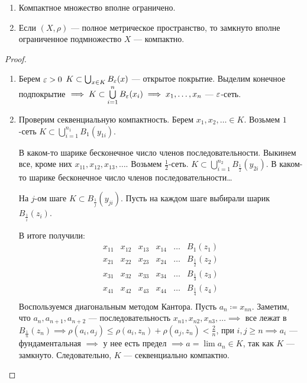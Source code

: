\begin{theorem}[Хаусдорфа]
    \begin{enumerate}
        \item Компактное множество вполне ограничено.
        \item Если $(X, \rho)$ --- полное метрическое пространство, то замкнуто вполне ограниченное подмножество  $X$ --- компактно.
    \end{enumerate}
\end{theorem}
\begin{proof}
    \begin{enumerate}
        \item Берем $\varepsilon > 0$  $K \subset \bigcup_{x \in K} B_\varepsilon(x)$ --- открытое покрытие. Выделим конечное подпокрытие  $\implies K \subset \bigcup\limits_{i=1}^n B_\varepsilon(x_i) \implies x_1, \ldots, x_n$  --- $\varepsilon$-сеть.
        \item Проверим секвенциальную компактность. Берем  $x_1, x_2, \ldots \in K$. Возьмем $1$-сеть  $K \subset \bigcup_{i=1}^{n_1} B_1(y_{1i})$.

            В каком-то шарике бесконечное число членов последовательности. Выкинем все, кроме них  $x_{11}, x_{12}, x_{13},\ldots$. Возьмем $\frac{1}{2}$-сеть. $K \subset \bigcup\limits_{i=1}^{n_2} B_{\frac{1}{2}}(y_{2i})$. В каком-то шарике бесконечное число членов последовательности\dots

            На $j$-ом шаге  $K \subset B_{\frac{1}{j}}(y_{ji})$. Пусть на каждом шаге выбирали шарик $B_{\frac{1}{i}}(z_i)$.

            В итоге получили:
            \[
            \begin{array}{cccccc}
                x_{11} & x_{12} & x_{13} & x_{14} & \ldots & B_1(z_1)\\
                x_{21} & x_{22} & x_{23} & x_{24} & \ldots & B_{\frac{1}{2}}(z_2)\\
                x_{31} & x_{32} & x_{33} & x_{34} & \ldots & B_{\frac{1}{3}}(z_3)\\
                x_{41} & x_{42} & x_{43} & x_{44} & \ldots & B_{\frac{1}{4}}(z_4)\\
            \end{array}            \] 
            Воспользуемся диагональным методом Кантора. Пусть $a_n \coloneqq x_{nn}$. Заметим, что  $a_n, a_{n+1}, a_{n+2}$ --- последовательность  $x_{n1}, x_{n 2}, x_{n 3},\ldots \implies$ все лежат в $B_{\frac{1}{n}}(z_n) \implies \rho(a_i, a_j) \le \rho(a_i, z_n) + \rho(a_j, z_n) < \frac{2}{n}$, при $i, j \ge n \implies a_i$ --- фундаментальная $\implies$ у нее есть предел  $\implies a = \lim a_n \in K$,  так как $K$ --- замкнуто. Следовательно,  $K$ --- секвенциально компактно.
    \end{enumerate}
\end{proof}
